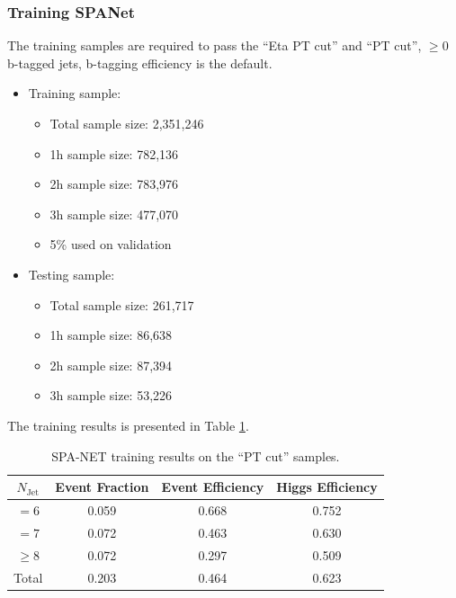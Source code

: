 \documentclass[12pt]{article}
\begin{document}
		\subsubsection{Training SPANet}%
		\label{subs:training_spanet}
			The training samples are required to pass the ``Eta PT cut'' and ``PT cut'', $\ge 0$ b-tagged jets, b-tagging efficiency is the default.
			\begin{itemize}
				\item Training sample:
				\begin{itemize}
					\item Total sample size: 2,351,246
					\item 1h sample size: 782,136
					\item 2h sample size: 783,976
					\item 3h sample size: 477,070
					\item 5\% used on validation
				\end{itemize}
				\item Testing sample: 
				\begin{itemize}
					\item Total sample size: 261,717
					\item 1h sample size: 86,638
					\item 2h sample size: 87,394
					\item 3h sample size: 53,226
				\end{itemize}
			\end{itemize}
			The training results is presented in Table \ref{tab:SPANet_triHiggs_0btag_default_pt_cut}.
			\begin{table}[htpb]
				\centering
				\caption{SPA-NET training results on the ``PT cut'' samples.}
				\label{tab:SPANet_triHiggs_0btag_default_pt_cut}
				\begin{tabular}{c|c|cc}
					$N_\text{Jet}$ & Event Fraction & Event Efficiency & Higgs Efficiency \\
					\hline
					$=6$	  &   0.059             &    0.668              &    0.752             \\
					$=7$	  &   0.072             &    0.463              &    0.630             \\
					$\ge 8$	  &   0.072             &    0.297              &    0.509             \\
					Total	  &   0.203             &    0.464              &    0.623             \\
				\end{tabular}
			\end{table}
\end{document}
